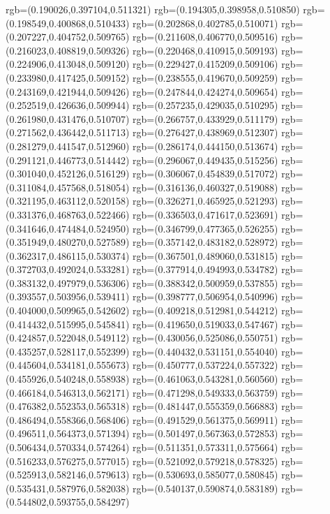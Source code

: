 {{{			rgb=(0.190026,0.397104,0.511321)
			rgb=(0.194305,0.398958,0.510850)
			rgb=(0.198549,0.400868,0.510433)
			rgb=(0.202868,0.402785,0.510071)
			rgb=(0.207227,0.404752,0.509765)
			rgb=(0.211608,0.406770,0.509516)
			rgb=(0.216023,0.408819,0.509326)
			rgb=(0.220468,0.410915,0.509193)
			rgb=(0.224906,0.413048,0.509120)
			rgb=(0.229427,0.415209,0.509106)
			rgb=(0.233980,0.417425,0.509152)
			rgb=(0.238555,0.419670,0.509259)
			rgb=(0.243169,0.421944,0.509426)
			rgb=(0.247844,0.424274,0.509654)
			rgb=(0.252519,0.426636,0.509944)
			rgb=(0.257235,0.429035,0.510295)
			rgb=(0.261980,0.431476,0.510707)
			rgb=(0.266757,0.433929,0.511179)
			rgb=(0.271562,0.436442,0.511713)
			rgb=(0.276427,0.438969,0.512307)
			rgb=(0.281279,0.441547,0.512960)
			rgb=(0.286174,0.444150,0.513674)
			rgb=(0.291121,0.446773,0.514442)
			rgb=(0.296067,0.449435,0.515256)
			rgb=(0.301040,0.452126,0.516129)
			rgb=(0.306067,0.454839,0.517072)
			rgb=(0.311084,0.457568,0.518054)
			rgb=(0.316136,0.460327,0.519088)
			rgb=(0.321195,0.463112,0.520158)
			rgb=(0.326271,0.465925,0.521293)
			rgb=(0.331376,0.468763,0.522466)
			rgb=(0.336503,0.471617,0.523691)
			rgb=(0.341646,0.474484,0.524950)
			rgb=(0.346799,0.477365,0.526255)
			rgb=(0.351949,0.480270,0.527589)
			rgb=(0.357142,0.483182,0.528972)
			rgb=(0.362317,0.486115,0.530374)
			rgb=(0.367501,0.489060,0.531815)
			rgb=(0.372703,0.492024,0.533281)
			rgb=(0.377914,0.494993,0.534782)
			rgb=(0.383132,0.497979,0.536306)
			rgb=(0.388342,0.500959,0.537855)
			rgb=(0.393557,0.503956,0.539411)
			rgb=(0.398777,0.506954,0.540996)
			rgb=(0.404000,0.509965,0.542602)
			rgb=(0.409218,0.512981,0.544212)
			rgb=(0.414432,0.515995,0.545841)
			rgb=(0.419650,0.519033,0.547467)
			rgb=(0.424857,0.522048,0.549112)
			rgb=(0.430056,0.525086,0.550751)
			rgb=(0.435257,0.528117,0.552399)
			rgb=(0.440432,0.531151,0.554040)
			rgb=(0.445604,0.534181,0.555673)
			rgb=(0.450777,0.537224,0.557322)
			rgb=(0.455926,0.540248,0.558938)
			rgb=(0.461063,0.543281,0.560560)
			rgb=(0.466184,0.546313,0.562171)
			rgb=(0.471298,0.549333,0.563759)
			rgb=(0.476382,0.552353,0.565318)
			rgb=(0.481447,0.555359,0.566883)
			rgb=(0.486494,0.558366,0.568406)
			rgb=(0.491529,0.561375,0.569911)
			rgb=(0.496511,0.564373,0.571394)
			rgb=(0.501497,0.567363,0.572853)
			rgb=(0.506434,0.570334,0.574264)
			rgb=(0.511351,0.573311,0.575664)
			rgb=(0.516233,0.576275,0.577015)
			rgb=(0.521092,0.579218,0.578325)
			rgb=(0.525913,0.582146,0.579613)
			rgb=(0.530693,0.585077,0.580845)
			rgb=(0.535431,0.587976,0.582038)
			rgb=(0.540137,0.590874,0.583189)
			rgb=(0.544802,0.593755,0.584297)
}}}
